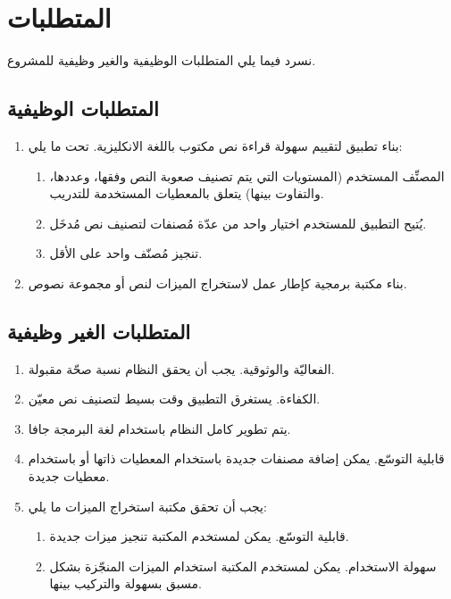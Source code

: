 \section{المتطلبات}
نسرد فيما يلي المتطلبات الوظيفية والغير وظيفية للمشروع.

\subsection{المتطلبات الوظيفية}

\begin{enumerate}
	\item 
	بناء تطبيق لتقييم سهولة قراءة نص مكتوب باللغة الانكليزية. تحت ما يلي:
	\begin{enumerate}
		\item 
		المصنِّف المستخدم (المستويات التي يتم تصنيف صعوبة النص وفقها، وعددها، والتفاوت بينها)
		يتعلق بالمعطيات المستخدمة للتدريب.
		\item 
		يُتيح التطبيق للمستخدم اختيار واحد من عدّة مُصنفات لتصنيف نص مُدخَل.
		\item 
		تنجيز مُصنّف واحد على الأقل.
	\end{enumerate}

	\item 
	بناء مكتبة برمجية كإطار عمل لاستخراج الميزات لنص أو مجموعة نصوص.
\end{enumerate}




\subsection{المتطلبات الغير وظيفية}
\begin{enumerate}
	\item 
	الفعاليّة والوثوقية. يجب أن يحقق النظام نسبة صحّة مقبولة.
	\item 
	الكفاءة. يستغرق التطبيق وقت بسيط لتصنيف نص معيّن.
	\item 
	يتم تطوير كامل النظام باستخدام لغة البرمجة جافا.
	\item 
	قابلية التوسّع. يمكن إضافة مصنفات جديدة باستخدام المعطيات ذاتها أو باستخدام معطيات جديدة.
	\item 
	يجب أن تحقق مكتبة استخراج الميزات ما يلي:
	\begin{enumerate}
		\item 
		قابلية التوسّع. يمكن لمستخدم المكتبة تنجيز ميزات جديدة.
		\item
		سهولة الاستخدام. يمكن لمستخدم المكتبة استخدام الميزات المنجّزة بشكل مسبق بسهولة والتركيب بينها.
	\end{enumerate}

\end{enumerate}



